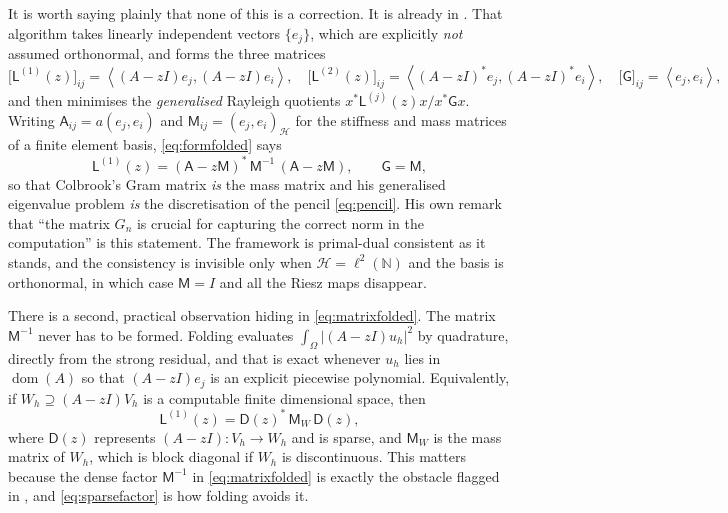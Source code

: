 \documentclass[11pt,a4paper]{article}
\theoremstyle{plain}
\newcommand{\N}{\mathbb{N}}
\newcommand{\abs}[1]{\left|#1\right|}
\newcommand{\dual}[2]{\left\langle #1, #2 \right\rangle}
\newcommand{\Hb}{\mathcal{H}}
\DeclareMathOperator{\dom}{dom}
\begin{document}
It is worth saying plainly that none of this is a correction.  It is already in
\cite[Algorithm~3.4, p.~115]{Colbrook2026}.  That algorithm takes linearly
independent vectors $\{e_j\}$, which are explicitly \emph{not} assumed
orthonormal, and forms the three matrices
\begin{equation}
  \label{eq:alg34}
  \bigl[\mathsf{L}^{(1)}(z)\bigr]_{ij} = \dual{(A-zI)e_j}{(A-zI)e_i},\quad
  \bigl[\mathsf{L}^{(2)}(z)\bigr]_{ij} = \dual{(A-zI)^*e_j}{(A-zI)^*e_i},\quad
  \bigl[\mathsf{G}\bigr]_{ij} = \dual{e_j}{e_i},
\end{equation}
and then minimises the \emph{generalised} Rayleigh quotients $x^*
\mathsf{L}^{(j)}(z)x / x^*\mathsf{G}x$.  Writing $\mathsf{A}_{ij} = a(e_j,e_i)$
and $\mathsf{M}_{ij} = (e_j,e_i)_{\Hb}$ for the stiffness and mass matrices of a
finite element basis, \cref{eq:formfolded} says
\begin{equation}
  \label{eq:matrixfolded}
  \mathsf{L}^{(1)}(z)
    = (\mathsf{A} - z\mathsf{M})^{*}\,\mathsf{M}^{-1}\,(\mathsf{A} - z\mathsf{M}),
  \qquad \mathsf{G} = \mathsf{M} ,
\end{equation}
so that Colbrook's Gram matrix \emph{is} the mass matrix and his generalised
eigenvalue problem \emph{is} the discretisation of the pencil
\cref{eq:pencil}.  His own remark that ``the matrix $G_n$ is crucial for
capturing the correct norm in the computation'' \cite[p.~115]{Colbrook2026} is
this statement.  The framework is primal-dual consistent as it stands, and the
consistency is invisible only when $\Hb = \ell^2(\N)$ and the basis is
orthonormal, in which case $\mathsf{M} = I$ and all the Riesz maps disappear.

There is a second, practical observation hiding in \cref{eq:matrixfolded}.  The
matrix $\mathsf{M}^{-1}$ never has to be formed.  Folding evaluates
$\int_\Omega \abs{(A - zI)u_h}^2$ by quadrature, directly from the strong
residual, and that is exact whenever $u_h$ lies in $\dom(A)$ so that $(A -
zI)e_j$ is an explicit piecewise polynomial.  Equivalently, if $W_h \supseteq
(A - zI)V_h$ is a computable finite dimensional space, then
\begin{equation}
  \label{eq:sparsefactor}
  \mathsf{L}^{(1)}(z) = \mathsf{D}(z)^{*}\,\mathsf{M}_{W}\,\mathsf{D}(z),
\end{equation}
where $\mathsf{D}(z)$ represents $(A - zI) \colon V_h \to W_h$ and is sparse,
and $\mathsf{M}_W$ is the mass matrix of $W_h$, which is block diagonal if $W_h$
is discontinuous.  This matters because the dense factor $\mathsf{M}^{-1}$ in
\cref{eq:matrixfolded} is exactly the obstacle flagged in
\cite[Remark~3.6]{LazzarinoNakatsukasaZerbinati2026}, and
\cref{eq:sparsefactor} is how folding avoids it.
\end{document}
